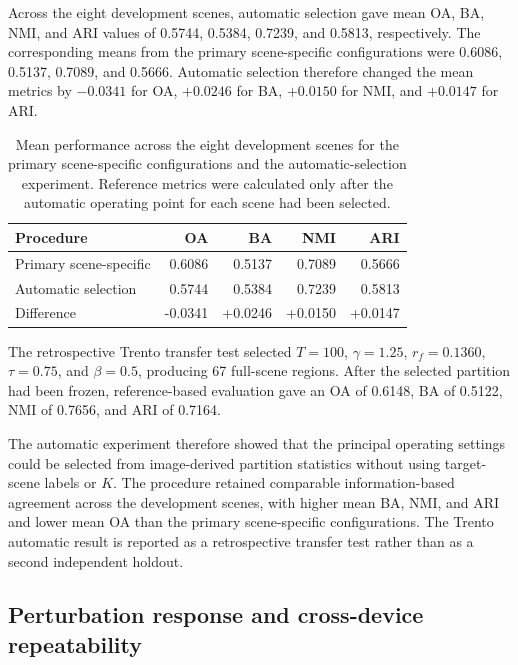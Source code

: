 \documentclass[10pt,a4paper,fleqn]{article}
\begin{document}
Across the eight development scenes, automatic selection gave mean OA, BA,
NMI, and ARI values of 0.5744, 0.5384, 0.7239, and 0.5813, respectively.
The corresponding means from the primary scene-specific configurations were
0.6086, 0.5137, 0.7089, and 0.5666. Automatic selection therefore changed
the mean metrics by \(-0.0341\) for OA, \(+0.0246\) for BA,
\(+0.0150\) for NMI, and \(+0.0147\) for ARI.

\begin{table}[!t]
\centering
\footnotesize
\caption{Mean performance across the eight development scenes for the primary
scene-specific configurations and the automatic-selection experiment.
Reference metrics were calculated only after the automatic operating point
for each scene had been selected.}
\label{tab:auto_selector_summary}

\renewcommand{\arraystretch}{1.06}
\setlength{\tabcolsep}{7pt}

\begin{tabular}{@{}lrrrr@{}}
\toprule
Procedure & OA & BA & NMI & ARI \\
\midrule
Primary scene-specific
& 0.6086 & 0.5137 & 0.7089 & 0.5666 \\
Automatic selection
& 0.5744 & 0.5384 & 0.7239 & 0.5813 \\
Difference
& -0.0341 & +0.0246 & +0.0150 & +0.0147 \\
\bottomrule
\end{tabular}
\end{table}

The retrospective Trento transfer test selected \(T=100\),
\(\gamma=1.25\), \(r_f=0.1360\), \(\tau=0.75\), and \(\beta=0.5\),
producing 67 full-scene regions. After the selected partition had been frozen,
reference-based evaluation gave an OA of 0.6148, BA of 0.5122, NMI of 0.7656,
and ARI of 0.7164.

The automatic experiment therefore showed that the principal operating
settings could be selected from image-derived partition statistics without
using target-scene labels or \(K\). The procedure retained comparable
information-based agreement across the development scenes, with higher mean
BA, NMI, and ARI and lower mean OA than the primary scene-specific
configurations. The Trento automatic result is reported as a retrospective
transfer test rather than as a second independent holdout.


\subsection{Perturbation response and cross-device repeatability}
\label{subsec:robustness_results}
\end{document}
